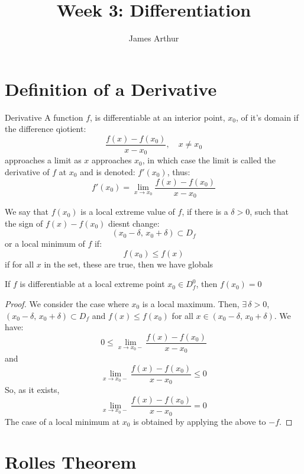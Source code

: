 \documentclass{article}
\title{Week 3: Differentiation}
\author{James Arthur}
\newcommand{\sub}{\subset}
\renewcommand{\d}{\delta}
\newcommand{\ex}{\exists\,}
\begin{document}
\maketitle
\tableofcontents
\newpage


\section{Definition of a Derivative}
\noindent\begin{definition}{Derivative}{}
   A function $f$, is differentiable at an interior point, $x_0$, of it's domain if the difference qiotient:
   $$ \frac{f(x) - f(x_0)}{x -x_0}, \quad x\neq x_0 $$
   approaches a limit as $x$ approaches $x_0$, in which case the limit is called the {\color{blue} derivative }of $f$ at $x_0$ and is denoted: $f'(x_0)$, thus:
   $$ f'(x_0) = \lim_{x\to x_0}\frac{f(x) - f(x_0)}{x -x_0} $$
\end{definition}\vspace{10pt}

\noindent\begin{definition}{}{}
   We say that $f(x_0)$ is a {\color{blue} local extreme }value of $f$, if there is a $\d > 0$, such that the sign of $f(x) - f(x_0)$ diesnt change:
   $$ (x_0 - \d, \, x_0 + \d) \sub D_f $$
   or a {\color{blue} local minimum } of $f$ if:
   $$ f(x_0) \le f(x) $$
   if for all $x$ in the set, these are true, then we have globals
\end{definition}\vspace{10pt}

\noindent\begin{theorem}{}{}
  If $f$ is differentiable at a local extreme point $x_0 \in D_f^0$, then $f(x_0) = 0$
\end{theorem}\vspace{10pt}
\begin{proof}
  We consider the case where $x_0$ is a local maximum. Then, $\ex \d > 0$, $\displaystyle{(x_0 - \d,\, x_0 + \d) \sub D_f}$ and $f(x) \le f(x_0)$ for all $x\in (x_0-\d,\, x_0+\d)$. We have:
  $$ 0 \le \lim_{x\to x_0-} \frac{f(x) - f(x_0)}{x - x_0} $$
  and
  $$ \lim_{x\to x_0-} \frac{f(x) - f(x_0)}{x - x_0} \le 0$$
  So, as it exists,
  $$ \lim_{x\to x_0-} \frac{f(x) - f(x_0)}{x - x_0} = 0 $$
  The case of a local minimum at $x_0$ is obtained by applying the above to $-f$.
\end{proof}

\section{Rolles Theorem}
\end{document}
